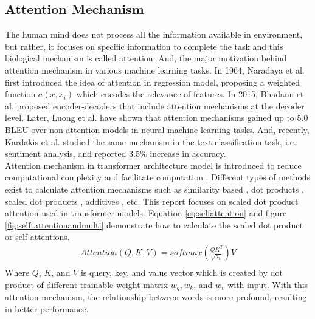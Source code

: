 \documentclass[%
	BCOR=8mm, %
	DIV=12,
	toc=bibliography, %
	toc=listof, %
	oneside, %
	egregdoesnotlikesansseriftitles, %
	]{scrbook}
\begin{document}
\subsection{Attention Mechanism}
The human mind does not process all the information available in environment, but rather, it focuses on specific information to complete the task and this biological mechanism is called attention. And, the major motivation behind attention mechanism in various machine learning tasks. In 1964, Naradaya et al. \cite{nadaraya_estimating_1964} first introduced the idea of attention in regression model, proposing a weighted function $a(x,x_{i})$ which encodes the relevance of features. In 2015, Bhadanu et al. \cite{bahdanau_neural_2014} proposed encoder-decoders that include attention mechanisms at the decoder level. Later, Luong et al. \cite{luong_effective_2015} have shown that attention mechanisms gained up to 5.0 BLEU over non-attention models in neural machine learning tasks. And, recently, Kardakis et al. \cite{kardakis_examining_2021} studied the same mechanism in the text classification task, i.e. sentiment analysis, and reported 3.5\% increase in accuracy.\\
Attention mechanism in transformer architecture model is introduced to reduce computational complexity and facilitate computation \cite{vaswani_attention_2017}. Different types of methods exist to calculate attention mechanisms such as similarity based \cite{graves_neural_2014}, dot products \cite{luong_effective_2015}, scaled dot products \cite{vaswani_attention_2017}, additives \cite{bahdanau_neural_2014}, etc. This report focuses on scaled dot product attention used in transformer models. Equation  \ref{eq:selfattention}  and figure \ref{fig:selftattentionandmulti} demonstrate how to calculate the scaled dot product or self-attentions.
\begin{equation}
    \begin{aligned}
        Attention(Q,K,V)=softmax(\frac{QK^T}{\sqrt{d_{k}}})V\\
        \label{eq:selfattention}
    \end{aligned}
\end{equation}
Where $Q$, $K$, and $V$ is query, key, and value vector which is created  by dot product of different trainable weight matrix $w_{q},w_{k}$, and $ w_{v}$ with input. With this attention mechanism, the relationship between words is more profound, resulting in better performance.\\
\end{document}

